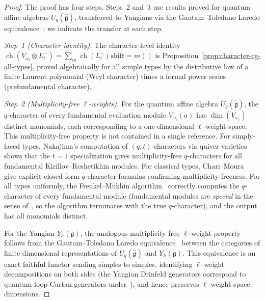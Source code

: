 \begin{proof}
The proof has four steps. Steps~2 and~3 use results
proved for quantum affine algebras $U_q(\hat{\mathfrak{g}})$,
transferred to Yangians via the Gautam--Toledano Laredo
equivalence~\cite{GTL17}; we indicate the transfer at each step.

\emph{Step~1 (Character identity).}
The character-level identity
$\operatorname{ch}(V_{\omega_i} \otimes L^-_i)
= \sum_m \operatorname{ch}(L^-_i(\mathrm{shift} = m))$
is Proposition~\ref{prop:character-cg-all-types}, proved
algebraically for all simple types by the distributive law
of a finite Laurent polynomial (Weyl character) times a formal
power series (prefundamental character).

\emph{Step~2 (Multiplicity-free $\ell$-weights).}
For the quantum affine algebra $U_q(\hat{\mathfrak{g}})$, the
$q$-character of every fundamental evaluation module
$V_{\omega_i}(a)$ has $\dim(V_{\omega_i})$ distinct monomials,
each corresponding to a one-dimensional $\ell$-weight space.
This multiplicity-free property is not contained in a single
reference. For simply-laced types, Nakajima's computation of
$(q,t)$-characters via quiver varieties~\cite{Nakajima04} shows
that the $t = 1$ specialization gives multiplicity-free
$q$-characters for all fundamental Kirillov--Reshetikhin
modules. For classical types, Chari--Moura~\cite{ChariMoura06}
give explicit closed-form $q$-character formulas confirming
multiplicity-freeness. For all types uniformly, the
Frenkel--Mukhin algorithm~\cite{FrenkelMukhin01} correctly
computes the $q$-character of every fundamental module
\textup{(}fundamental modules are \emph{special} in the sense
of~\cite{FrenkelMukhin01}, so the algorithm terminates with the
true $q$-character\textup{)}, and the output has all monomials
distinct.

For the Yangian $Y_\hbar(\mathfrak{g})$, the analogous
multiplicity-free $\ell$-weight property follows from the
Gautam--Toledano Laredo equivalence~\cite{GTL17}
between the categories of finite-dimensional representations
of $U_q(\hat{\mathfrak{g}})$ and $Y_\hbar(\mathfrak{g})$.
This equivalence is an exact faithful functor sending simples to
simples, identifying $\ell$-weight decompositions on both sides
\textup{(}the Yangian Drinfeld generators correspond to
quantum loop Cartan generators under~\cite{GTL17}\textup{)},
and hence preserves $\ell$-weight space dimensions.


\end{proof}
